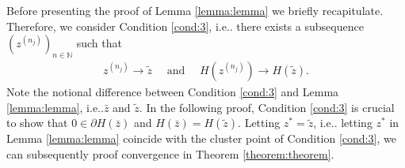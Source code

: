 \documentclass[onecolumn,final,a4paper,13pt,reqno]{siamart}
\makeatletter
\DeclareRobustCommand\onedot{\futurelet\@let@token\@onedot}
\def\@onedot{\ifx\@let@token.\else.\null\fi\xspace}
\def\ie{{i.e}\onedot} \def\Ie{{I.e}\onedot}
\makeatother
\begin{document}
Before presenting the proof of Lemma \ref{lemma:lemma} we briefly recapitulate. Therefore, we consider Condition \ref{cond:3}, \ie there exists a subsequence $(z^{(n_j)})_{n \in \mathbb{N}}$ such that
\begin{align}
	z^{(n_j)} \rightarrow \tilde{z}\quad\text{ and }\quad H(z^{(n_j)}) \rightarrow H(\tilde{z}).
\end{align}
Note the notional difference between Condition \ref{cond:3} and Lemma \ref{lemma:lemma}, \ie $\bar{z}$ and $\tilde{z}$. In the following proof, Condition \ref{cond:3} is crucial to show that $0 \in \partial H(\bar{z})$ and $H(\bar{z}) = H(\tilde{z})$. Letting $z^\ast = \tilde{z}$, \ie letting $z^\ast$ in Lemma \ref{lemma:lemma} coincide with the cluster point of Condition \ref{cond:3}, we can subsequently proof convergence in Theorem \ref{theorem:theorem}.
\end{document}
